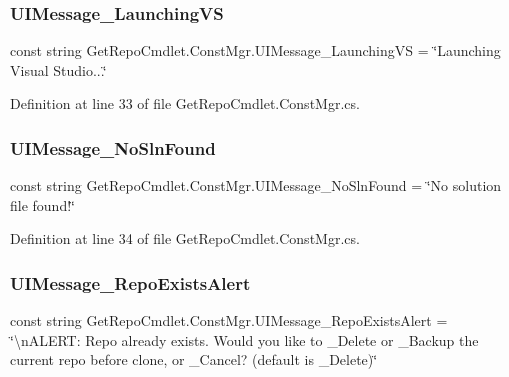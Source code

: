 \subsubsection{\texorpdfstring{U\+I\+Message\+\_\+\+Launching\+VS}{UIMessage\_LaunchingVS}}
{\footnotesize\ttfamily const string Get\+Repo\+Cmdlet.\+Const\+Mgr.\+U\+I\+Message\+\_\+\+Launching\+VS = \char`\"{}Launching Visual Studio...\char`\"{}\hspace{0.3cm}{\ttfamily [package]}}



Definition at line 33 of file Get\+Repo\+Cmdlet.\+Const\+Mgr.\+cs.

\mbox{\label{class_get_repo_cmdlet_1_1_const_mgr_a4141d4c7adb23338403989ce7ac35054}} 
\subsubsection{\texorpdfstring{U\+I\+Message\+\_\+\+No\+Sln\+Found}{UIMessage\_NoSlnFound}}
{\footnotesize\ttfamily const string Get\+Repo\+Cmdlet.\+Const\+Mgr.\+U\+I\+Message\+\_\+\+No\+Sln\+Found = \char`\"{}No solution file found!\char`\"{}\hspace{0.3cm}{\ttfamily [package]}}



Definition at line 34 of file Get\+Repo\+Cmdlet.\+Const\+Mgr.\+cs.

\mbox{\label{class_get_repo_cmdlet_1_1_const_mgr_af23b1d641e7d9262b956b7240a974ada}} 
\subsubsection{\texorpdfstring{U\+I\+Message\+\_\+\+Repo\+Exists\+Alert}{UIMessage\_RepoExistsAlert}}
{\footnotesize\ttfamily const string Get\+Repo\+Cmdlet.\+Const\+Mgr.\+U\+I\+Message\+\_\+\+Repo\+Exists\+Alert = \char`\"{}\textbackslash{}n\+A\+L\+E\+R\+T\+: Repo already exists. Would you like to \+\_\+\+Delete or \+\_\+\+Backup the current repo before clone, or \+\_\+\+Cancel? (default is \+\_\+\+Delete)\char`\"{}\hspace{0.3cm}{\ttfamily [package]}}



